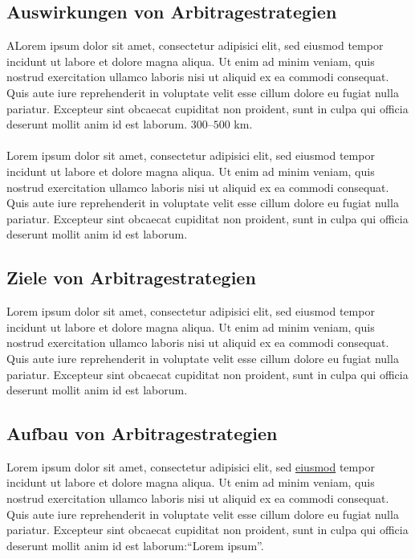 \documentclass[12pt, a4paper, oneside]{article}
\begin{document}
\subsection{Auswirkungen von Arbitragestrategien}
ALorem ipsum dolor sit amet, consectetur adipisici elit, sed eiusmod tempor incidunt ut labore et dolore magna aliqua. Ut enim ad minim veniam, quis nostrud exercitation ullamco laboris nisi ut aliquid ex ea commodi consequat. Quis aute iure reprehenderit in voluptate velit esse cillum dolore eu fugiat nulla pariatur. Excepteur sint obcaecat cupiditat non proident, sunt in culpa qui officia deserunt mollit anim id est laborum. $300$--$500$ km.\\
\\
Lorem ipsum dolor sit amet, consectetur adipisici elit, sed eiusmod tempor incidunt ut labore et dolore magna aliqua. Ut enim ad minim veniam, quis nostrud exercitation ullamco laboris nisi ut aliquid ex ea commodi consequat. Quis aute iure reprehenderit in voluptate velit esse cillum dolore eu fugiat nulla pariatur. Excepteur sint obcaecat cupiditat non proident, sunt in culpa qui officia deserunt mollit anim id est laborum.

\subsection{Ziele von Arbitragestrategien}
Lorem ipsum dolor sit amet, consectetur adipisici elit, sed eiusmod tempor incidunt ut labore et dolore magna aliqua. Ut enim ad minim veniam, quis nostrud exercitation ullamco laboris nisi ut aliquid ex ea commodi consequat. Quis aute iure reprehenderit in voluptate velit esse cillum dolore eu fugiat nulla pariatur. Excepteur sint obcaecat cupiditat non proident, sunt in culpa qui officia deserunt mollit anim id est laborum.\\

\subsection{Aufbau von Arbitragestrategien}
Lorem ipsum dolor sit amet, consectetur adipisici elit, sed \underline{eiusmod} tempor incidunt ut labore et dolore magna aliqua. Ut enim ad minim veniam, quis nostrud exercitation ullamco laboris nisi ut aliquid ex ea commodi consequat. Quis aute iure reprehenderit in voluptate velit esse cillum dolore eu fugiat nulla pariatur. Excepteur sint obcaecat cupiditat non proident, sunt in culpa qui officia deserunt mollit anim id est laborum:``Lorem ipsum''.
\end{document}
